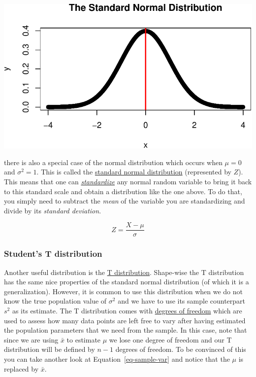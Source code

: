 \documentclass[
  letterpaper,
  DIV=11,
  numbers=noendperiod]{scrartcl}
\begin{document}
\begin{center}
\includegraphics{stats_review_files/figure-pdf/unnamed-chunk-18-1.pdf}
\end{center}

there is also a special case of the normal distribution which occurs
when \(\mu=0\) and \(\sigma^2=1\). This is called the
\href{https://www.scribbr.com/statistics/standard-normal-distribution/}{standard
normal distribution} (represented by \(Z\)). This means that one can
\href{https://www.listendata.com/2017/04/how-to-standardize-variable-in-regression.html}{\emph{standardize}}
any normal random variable to bring it back to this standard scale and
obtain a distribution like the one above. To do that, you simply need to
subtract the \emph{mean} of the variable you are standardizing and
divide by its \emph{standard deviation}.

\[
Z = \frac{X - \mu}{\sigma}
\]

\subsubsection{Student's T distribution}\label{students-t-distribution}

Another useful distribution is the
\href{https://en.wikipedia.org/wiki/Student\%27s_t-distribution}{T
distribution}. Shape-wise the T distribution has the same nice
properties of the standard normal distribution (of which it is a
generalization). However, it is common to use this distribution when we
do not know the true population value of \(\sigma^2\) and we have to use
its sample counterpart \(s^{2}\) as its estimate. The T distribution
comes with
\href{https://www.scribbr.com/statistics/degrees-of-freedom/\#:~:text=Degrees\%20of\%20freedom\%2C\%20often\%20represented,minus\%20the\%20number\%20of\%20restrictions.}{degrees
of freedom} which are used to assess how many data points are left free
to vary after having estimated the population parameters that we need
from the sample. In this case, note that since we are using \(\bar{x}\)
to estimate \(\mu\) we lose one degree of freedom and our T distribution
will be defined by \(n-1\) degrees of freedom. To be convinced of this
you can take another look at Equation~\ref{eq-sample-var} and notice
that the \(\mu\) is replaced by \(\bar{x}\).
\end{document}
